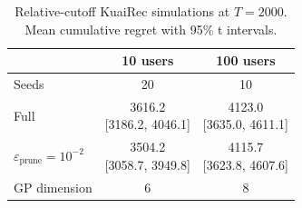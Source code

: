 \begin{table}[htbp]
\centering\small
\caption{Relative-cutoff KuaiRec simulations at $T=2000$. Mean cumulative regret with 95\% t intervals.}
\label{tab:kuairec}
\begin{tabular}{@{}lcc@{}}
\toprule
 & 10 users & 100 users \\
\midrule
Seeds & 20 & 10 \\
Full & \shortstack{3616.2\\ {[3186.2, 4046.1]}} & \shortstack{4123.0\\ {[3635.0, 4611.1]}} \\
$\varepsilon_{\mathrm{prune}}=10^{-2}$ & \shortstack{3504.2\\ {[3058.7, 3949.8]}} & \shortstack{4115.7\\ {[3623.8, 4607.6]}} \\
GP dimension & 6 & 8 \\
\bottomrule
\end{tabular}
\end{table}
